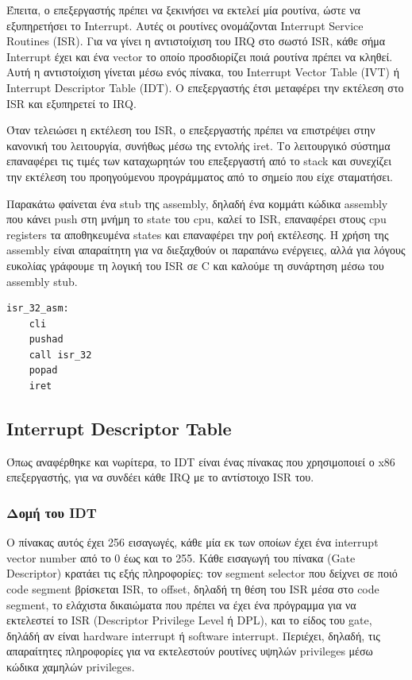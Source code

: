 \documentclass[18pt]{extarticle}
\begin{document}
Έπειτα, ο επεξεργαστής πρέπει να ξεκινήσει να εκτελεί μία ρουτίνα, ώστε να εξυπηρετήσει το Interrupt. Αυτές οι ρουτίνες ονομάζονται
Interrupt Service Routines (ISR). Για να γίνει η αντιστοίχιση του IRQ στο σωστό ISR, κάθε σήμα Interrupt έχει και ένα vector το οποίο
προσδιορίζει ποιά ρουτίνα πρέπει να κληθεί. Αυτή η αντιστοίχιση γίνεται μέσω ενός πίνακα, του Interrupt Vector Table (IVT) ή Interrupt
Descriptor Table (IDT). Ο επεξεργαστής έτσι μεταφέρει την εκτέλεση στο ISR και εξυπηρετεί το IRQ. 

Όταν τελειώσει η εκτέλεση του ISR, ο επεξεργαστής πρέπει να επιστρέψει στην κανονική του λειτουργία, συνήθως μέσω της εντολής iret.
Το λειτουργικό σύστημα επαναφέρει τις τιμές των καταχωρητών του επεξεργαστή από το stack και συνεχίζει την εκτέλεση του προηγούμενου 
προγράμματος από το σημείο που είχε σταματήσει.

Παρακάτω φαίνεται ένα stub της assembly, δηλαδή ένα κομμάτι κώδικα assembly που κάνει push στη μνήμη το state του cpu, καλεί το ISR,
επαναφέρει στους cpu registers τα αποθηκευμένα states και επαναφέρει την ροή εκτέλεσης. Η χρήση της assembly είναι απαραίτητη για να
διεξαχθούν οι παραπάνω ενέργειες, αλλά για λόγους ευκολίας γράφουμε τη λογική του ISR σε C και καλούμε τη συνάρτηση μέσω του assembly stub.

\begin{file}
    \footnotesize \begin{lstlisting}[language={[x86masm]Assembler}, tabsize=2]
isr_32_asm:
    cli
    pushad
    call isr_32
    popad
    iret
    \end{lstlisting}
\end{file}

\subsection{Interrupt Descriptor Table}

Όπως αναφέρθηκε και νωρίτερα, το IDT είναι ένας πίνακας που χρησιμοποιεί ο x86 επεξεργαστής, για να συνδέει κάθε IRQ με το αντίστοιχο
ISR του.

\subsubsection{Δομή του IDT}

Ο πίνακας αυτός έχει 256 εισαγωγές, κάθε μία εκ των οποίων έχει ένα interrupt vector number από το 0 έως και το 255. Κάθε εισαγωγή του
πίνακα (Gate Descriptor) κρατάει τις εξής πληροφορίες: τον segment selector που δείχνει σε ποιό code segment βρίσκεται ISR, το offset, 
δηλαδή τη θέση του ISR μέσα στο code segment, το ελάχιστα δικαιώματα που πρέπει να έχει ένα πρόγραμμα για να εκτελεστεί το ISR (Descriptor
Privilege Level ή DPL), και το είδος του gate, δηλάδή αν είναι hardware interrupt ή software interrupt. Περιέχει,
δηλαδή, τις απαραίτητες πληροφορίες για να εκτελεστούν ρουτίνες υψηλών privileges μέσω κώδικα χαμηλών privileges.
\end{document}
